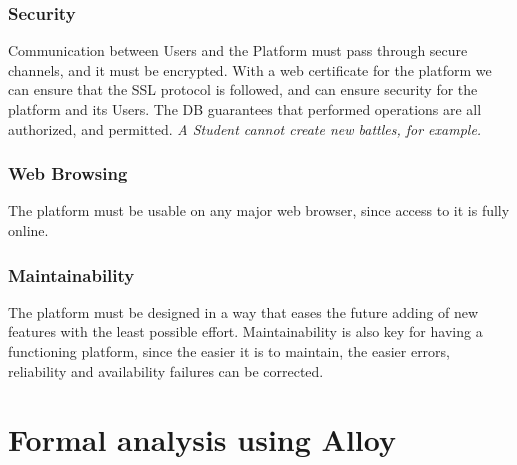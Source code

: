 \documentclass{article}
\begin{document}
{\subsubsection{Security}
Communication between Users and the Platform must pass through secure channels, and it must be encrypted.
With a web certificate for the platform we can ensure that the SSL protocol is followed, and can ensure security for the platform and its Users.
The DB guarantees that performed operations are all authorized, and permitted.
\textit{A Student cannot create new battles, for example.}
\subsubsection{Web Browsing}
The platform must be usable on any major web browser, since access to it is fully online.
\subsubsection{Maintainability}
The platform must be designed in a way that eases the future adding of new features with the least possible effort.
Maintainability is also key for having a functioning platform, since the easier it is to maintain, the easier errors, reliability and availability failures
can be corrected.
\newpage
\pagestyle{FormalAnalysisAlloyStyle}

\section{Formal analysis using Alloy}

\newpage
\pagestyle{EffortSpentStyle}


}
\end{document}
